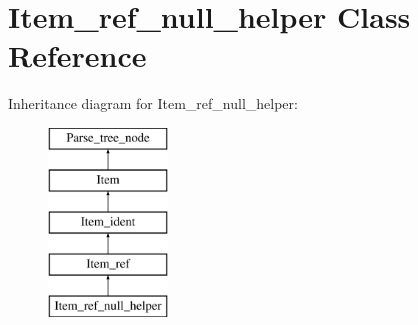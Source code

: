 \hypertarget{classItem__ref__null__helper}{}\section{Item\+\_\+ref\+\_\+null\+\_\+helper Class Reference}
\label{classItem__ref__null__helper}
Inheritance diagram for Item\+\_\+ref\+\_\+null\+\_\+helper\+:\begin{figure}[H]
\begin{center}
\leavevmode
\includegraphics[height=5.000000cm]{classItem__ref__null__helper}
\end{center}
\end{figure}
